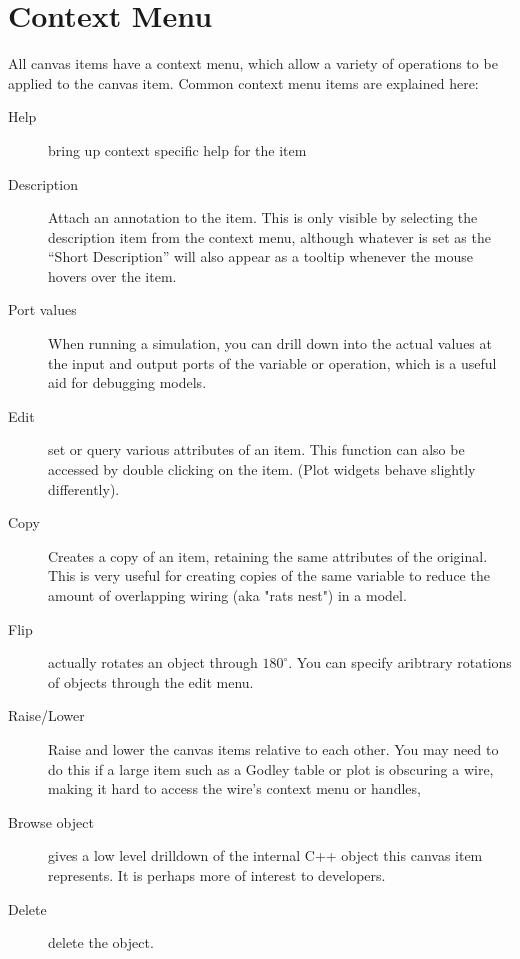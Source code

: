 \section{Context Menu}

All canvas items have a context menu, which allow a variety of
operations to be applied to the canvas item. Common context menu items
are explained here:
\begin{description}
\item[Help] bring up context specific help for the item
\item[Description] Attach an annotation to the item. This is only
visible by selecting the description item from the context menu,
although whatever is set as the ``Short Description'' will also appear
as a tooltip whenever the mouse hovers over the item.
\item[Port values] When running a simulation, you can drill down into
the actual values at the input and output ports of the variable or
operation, which is a useful aid for debugging models.
\item[Edit] set or query various attributes of an item. This function
can also be accessed by double clicking on the item. (Plot widgets
behave slightly differently).
\item[Copy] Creates a copy of an item, retaining the same attributes
of the original. This is very useful for creating copies of the same
variable to reduce the amount of overlapping wiring (aka "rats nest")
in a model.
\item[Flip] actually rotates an object through $180^\circ$. You can
specify aribtrary rotations of objects through the edit menu.
\item[Raise/Lower] Raise and lower the canvas items relative to each
other. You may need to do this if a large item such as a Godley table
or plot is obscuring a wire, making it hard to access the wire's
context menu or handles,
\item[Browse object] gives a low level drilldown of the internal C++
object this canvas item represents. It is perhaps more of interest to
developers. 
\item[Delete] delete the object.
\end{description}

